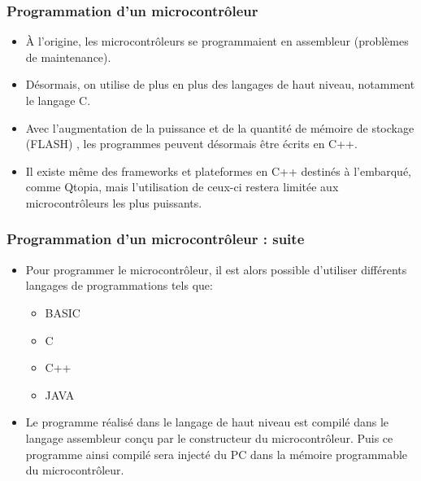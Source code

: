 \documentclass{beamer}
\begin{document}
\begin{frame}
\frametitle{Programmation d'un microcontrôleur}
\begin{itemize}
\item À l'origine, les microcontrôleurs se programmaient en assembleur (problèmes de maintenance).
\item Désormais, on utilise de plus en plus des langages de haut niveau, notamment le langage C.
\item Avec l’augmentation de la puissance et de la quantité de mémoire de stockage (FLASH) , les programmes  peuvent désormais être écrits en C++. 
\item Il existe même des frameworks et plateformes en C++ destinés à l’embarqué, comme Qtopia, mais l'utilisation de ceux-ci restera limitée aux microcontrôleurs les plus puissants. 
\end{itemize}
\end{frame}
\begin{frame}
\frametitle{Programmation d'un microcontrôleur : suite}
\begin{itemize}
\item  Pour programmer le microcontrôleur, il est alors possible d'utiliser différents langages de programmations tels que:
\begin{itemize}
  \item BASIC
  \item C
  \item C++
  \item JAVA
  \end{itemize}
\end{itemize}
\begin{itemize}
  \item Le programme réalisé dans le langage de haut niveau est compilé dans le langage assembleur conçu par le constructeur du microcontrôleur. Puis ce programme ainsi compilé sera injecté du PC dans la mémoire programmable du microcontrôleur.
\end{itemize}
\end{frame}
\end{document}
